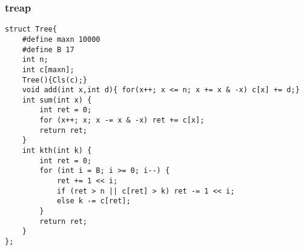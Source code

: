 \subsubsection{treap}
\begin{verbatim}
struct Tree{
    #define maxn 10000
    #define B 17
    int n;
    int c[maxn];
    Tree(){Cls(c);}
    void add(int x,int d){ for(x++; x <= n; x += x & -x) c[x] += d;}
    int sum(int x) {
        int ret = 0;
        for (x++; x; x -= x & -x) ret += c[x];
        return ret;
    }
    int kth(int k) {
        int ret = 0;
        for (int i = B; i >= 0; i--) {
            ret += 1 << i;
            if (ret > n || c[ret] > k) ret -= 1 << i;
            else k -= c[ret];
        }
        return ret;
    }
};
\end{verbatim}
